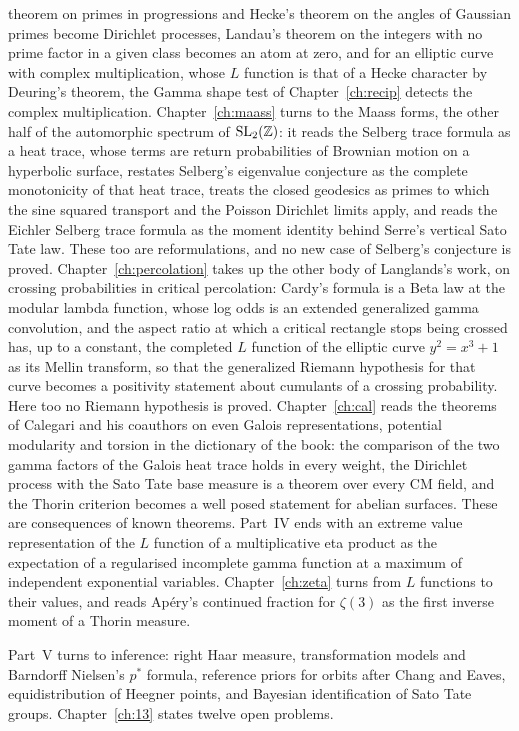 theorem on primes in progressions and Hecke's theorem on the angles of Gaussian primes become Dirichlet processes, Landau's theorem on the integers with no prime factor in a given class becomes an atom at zero, and for an elliptic curve with complex multiplication, whose $L$ function is that of a Hecke character by Deuring's theorem, the Gamma shape test of Chapter~\ref{ch:recip} detects the complex multiplication. Chapter~\ref{ch:maass} turns to the Maass forms, the other half of the automorphic spectrum of $\mathrm{SL}_2(\mathbb{Z})$: it reads the Selberg trace formula as a heat trace, whose terms are return probabilities of Brownian motion on a hyperbolic surface, restates Selberg's eigenvalue conjecture as the complete monotonicity of that heat trace, treats the closed geodesics as primes to which the sine squared transport and the Poisson Dirichlet limits apply, and reads the Eichler Selberg trace formula as the moment identity behind Serre's vertical Sato Tate law. These too are reformulations, and no new case of Selberg's conjecture is proved. Chapter~\ref{ch:percolation} takes up the other body of Langlands's work, on crossing probabilities in critical percolation: Cardy's formula is a Beta law at the modular lambda function, whose log odds is an extended generalized gamma convolution, and the aspect ratio at which a critical rectangle stops being crossed has, up to a constant, the completed $L$ function of the elliptic curve $y^2=x^3+1$ as its Mellin transform, so that the generalized Riemann hypothesis for that curve becomes a positivity statement about cumulants of a crossing probability. Here too no Riemann hypothesis is proved. Chapter~\ref{ch:cal} reads the theorems of Calegari and his coauthors on even Galois representations, potential modularity and torsion in the dictionary of the book: the comparison of the two gamma factors of the Galois heat trace holds in every weight, the Dirichlet process with the Sato Tate base measure is a theorem over every CM field, and the Thorin criterion becomes a well posed statement for abelian surfaces. These are consequences of known theorems. Part~IV ends with an extreme value representation of the $L$ function of a multiplicative eta product as the expectation of a regularised incomplete gamma function at a maximum of independent exponential variables. Chapter~\ref{ch:zeta} turns from $L$ functions to their values, and reads Ap\'ery's continued fraction for $\zeta(3)$ as the first inverse moment of a Thorin measure.

Part~V turns to inference: right Haar measure, transformation models and Barndorff Nielsen's $p^*$ formula, reference priors for orbits after Chang and Eaves, equidistribution of Heegner points, and Bayesian identification of Sato Tate groups. Chapter~\ref{ch:13} states twelve open problems.

